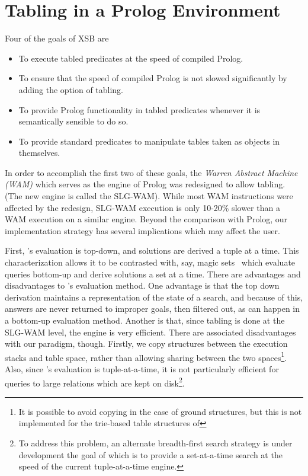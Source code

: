 \section{Tabling in a Prolog Environment}\label{tabling_env}

Four of the goals of XSB are 
\begin{itemize}
\item	To execute tabled predicates at the speed of compiled Prolog.
\item	To ensure that the speed of compiled Prolog is not slowed
	significantly by adding the option of tabling.
\item	To provide Prolog functionality in tabled predicates 
	whenever it is semantically sensible to do so.
\item	To provide standard predicates to manipulate tables
	taken as objects in themselves.
\end{itemize}

In order to accomplish the first two of these goals, the {\em Warren
Abstract Machine (WAM)} which serves as the engine of Prolog was
redesigned to allow tabling.  (The new engine is called the SLG-WAM).
While most WAM instructions were affected by the redesign, SLG-WAM
execution is only 10-20\% slower than a WAM execution on a similar
engine.  Beyond the comparison with Prolog, our implementation
strategy has several implications which may affect the user.

First, \ourprolog's evaluation is top-down, and solutions are derived
a tuple at a time.  This characterization allows it to be contrasted
with, say, magic sets~\cite{BMSU86} which evaluate queries
bottom-up and derive solutions a set at a time.  There are advantages
and disadvantages to \ourprolog's evaluation method.  One advantage is
that the top down derivation maintains a representation of the state
of a search, and because of this, answers are never returned to
improper goals, then filtered out, as can happen in a bottom-up
evaluation method.  Another is that, since tabling is done at the
SLG-WAM level, the engine is very efficient.  There are associated
disadvantages with our paradigm, though.  Firstly, we copy structures
between the execution stacks and table space, rather than allowing
sharing between the two spaces\footnote{It is possible to avoid
copying in the case of ground structures, but this is not implemented
for the trie-based table structures of \version}.  Also, since
\ourprolog's evaluation is tuple-at-a-time, it is not particularly
efficient for queries to large relations which are kept on
disk\footnote{To address this problem, an alternate breadth-first
search strategy is under development the goal of which is to provide a
set-at-a-time search at the speed of the current tuple-at-a-time
engine.}.

